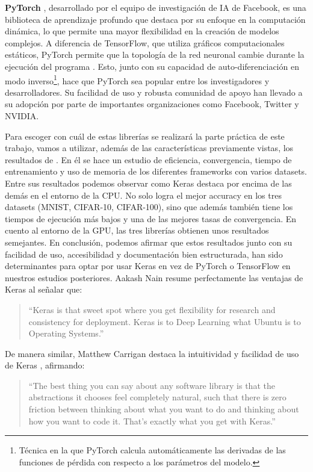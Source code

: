\textbf{PyTorch} \citep{pytorch}, desarrollado por el equipo de investigación de IA de Facebook, es una biblioteca de aprendizaje profundo que destaca por su enfoque en la computación dinámica, lo que permite una mayor flexibilidad en la creación de modelos complejos. A diferencia de TensorFlow, que utiliza gráficos computacionales estáticos, PyTorch permite que la topología de la red neuronal cambie durante la ejecución del programa \citep{mahmoud2019dlbench}. Esto, junto con su capacidad de auto-diferenciación en modo inverso\footnote{Técnica en la que PyTorch calcula automáticamente las derivadas de las funciones de pérdida con respecto a los parámetros del modelo.}, hace que PyTorch sea popular entre los investigadores y desarrolladores. Su facilidad de uso y robusta comunidad de apoyo han llevado a su adopción por parte de importantes organizaciones como Facebook, Twitter y NVIDIA.



Para escoger con cuál de estas librerías se realizará la parte práctica de este trabajo, vamos a utilizar, además de las características previamente vistas, los resultados de \citep{mahmoud2019dlbench}. En él se hace un estudio de eficiencia, convergencia, tiempo de entrenamiento y uso de memoria de los diferentes frameworks con varios datasets. Entre sus resultados podemos observar como Keras destaca por encima de las demás en el entorno de la CPU. No solo logra el mejor accuracy en los tres datasets (MNIST, CIFAR-10, CIFAR-100), sino que además también tiene los tiempos de ejecución más bajos y una de las mejores tasas de convergencia. En cuento al entorno de la GPU, las tres librerías obtienen unos resultados semejantes. En conclusión, podemos afirmar que estos resultados junto con su facilidad de uso, accesibilidad y documentación bien estructurada, han sido determinantes para optar por usar Keras en vez de PyTorch o TensorFlow en nuestros estudios posteriores. Aakash Nain resume perfectamente las ventajas de Keras \citep{keraswebsite2} al señalar que:

\begin{quote} 
``Keras is that sweet spot where you get flexibility for research and consistency for deployment. Keras is to Deep Learning what Ubuntu is to Operating Systems.'' 
\end{quote}

De manera similar, Matthew Carrigan destaca la intuitividad y facilidad de uso de Keras \citep{keraswebsite}, afirmando:

\begin{quote}
``The best thing you can say about any software library is that the abstractions it chooses feel completely natural, such that there is zero friction between thinking about what you want to do and thinking about how you want to code it. That's exactly what you get with Keras.''
\end{quote}


